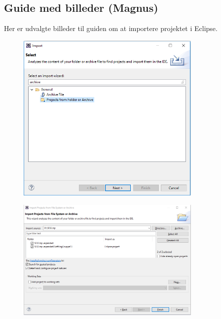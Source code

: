 \subsection{Guide med billeder (Magnus)}

Her er udvalgte billeder til guiden om at importere projektet i Eclipse.
\begin{figure}[H]
    \centering
    \includegraphics[width = 0.8\textwidth]{Figurer/Guide/ImportAsArchive.PNG}
\end{figure}

\begin{figure}[H]
    \centering
    \includegraphics[width = 0.8\textwidth]{Figurer/Guide/ImportAsArchive2.PNG}
\end{figure}

